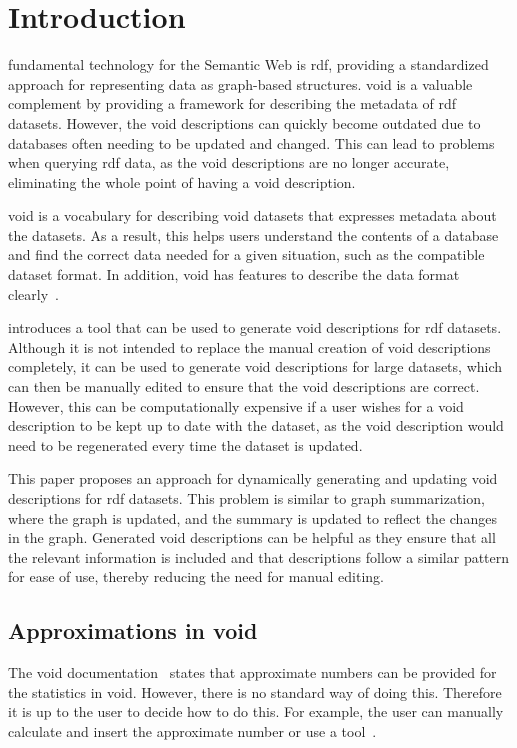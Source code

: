 \section{Introduction}\label{sec:introduction2}
 fundamental technology for the Semantic Web is \gls{rdf}, providing a standardized approach for representing data as graph-based structures. \gls{void} is a valuable complement by providing a framework for describing the metadata of \gls{rdf} datasets. However, the \gls{void} descriptions can quickly become outdated due to databases often needing to be updated and changed. This can lead to problems when querying \gls{rdf} data, as the \gls{void} descriptions are no longer accurate, eliminating the whole point of having a \gls{void} description.

\gls{void} is a vocabulary for describing \gls{void} datasets that expresses metadata about the datasets. As a result, this helps users understand the contents of a database and find the correct data needed for a given situation, such as the compatible dataset format. In addition, \gls{void} has features to describe the data format clearly~\cite{documentation-void}.

\cite{creating-void-descriptions} introduces a tool that can be used to generate \gls{void} descriptions for \gls{rdf} datasets. Although it is not intended to replace the manual creation of \gls{void} descriptions completely, it can be used to generate \gls{void} descriptions for large datasets, which can then be manually edited to ensure that the \gls{void} descriptions are correct. However, this can be computationally expensive if a user wishes for a \gls{void} description to be kept up to date with the dataset, as the \gls{void} description would need to be regenerated every time the dataset is updated.

This paper proposes an approach for dynamically generating and updating \gls{void} descriptions for \gls{rdf} datasets. This problem is similar to graph summarization, where the graph is updated, and the summary is updated to reflect the changes in the graph. Generated \gls{void} descriptions can be helpful as they ensure that all the relevant information is included and that descriptions follow a similar pattern for ease of use, thereby reducing the need for manual editing.

\subsection{Approximations in \gls{void}} \label{sec:approximations}
The \gls{void} documentation~\cite{documentation-void} states that approximate numbers can be provided for the statistics in \gls{void}.
However, there is no standard way of doing this. Therefore it is up to the user to decide how to do this. For example, the user can manually calculate and insert the approximate number or use a tool~\cite{the-web-of-data}.

